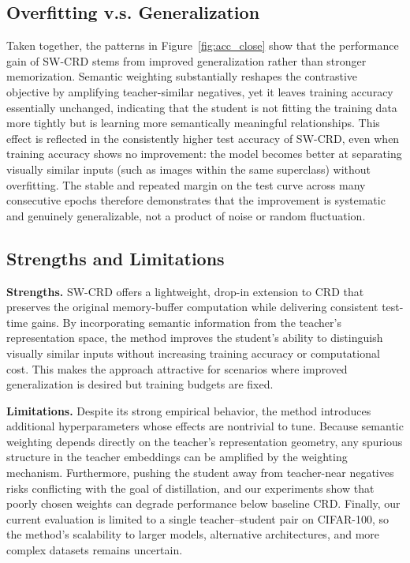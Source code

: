 \documentclass{article}
\theoremstyle{plain}
\theoremstyle{remark}
\begin{document}
\subsection{Overfitting v.s. Generalization}

Taken together, the patterns in Figure~\ref{fig:acc_close} show that the performance gain of SW-CRD stems from improved generalization rather than stronger memorization. Semantic weighting substantially reshapes the contrastive objective by amplifying teacher-similar negatives, yet it leaves training accuracy essentially unchanged, indicating that the student is not fitting the training data more tightly but is learning more semantically meaningful relationships. This effect is reflected in the consistently higher test accuracy of SW-CRD, even when training accuracy shows no improvement: the model becomes better at separating visually similar inputs (such as images within the same superclass) without overfitting. The stable and repeated margin on the test curve across many consecutive epochs therefore demonstrates that the improvement is systematic and genuinely generalizable, not a product of noise or random fluctuation.

\subsection{Strengths and Limitations}

\textbf{Strengths.}
SW-CRD offers a lightweight, drop-in extension to CRD that preserves the original memory-buffer computation while delivering consistent test-time gains. By incorporating semantic information from the teacher’s representation space, the method improves the student’s ability to distinguish visually similar inputs without increasing training accuracy or computational cost. This makes the approach attractive for scenarios where improved generalization is desired but training budgets are fixed.

\textbf{Limitations.}
Despite its strong empirical behavior, the method introduces additional hyperparameters whose effects are nontrivial to tune. Because semantic weighting depends directly on the teacher’s representation geometry, any spurious structure in the teacher embeddings can be amplified by the weighting mechanism. Furthermore, pushing the student away from teacher-near negatives risks conflicting with the goal of distillation, and our experiments show that poorly chosen weights can degrade performance below baseline CRD. Finally, our current evaluation is limited to a single teacher–student pair on CIFAR-100, so the method’s scalability to larger models, alternative architectures, and more complex datasets remains uncertain.
\end{document}
